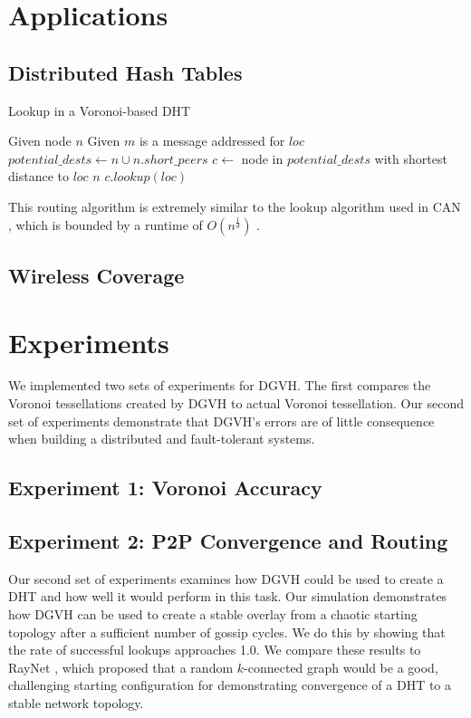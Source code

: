 \documentclass[11pt, conference, letterpaper]{IEEEtran}
\begin{document}
\section{Applications}
\label{sec:applications}

\subsection{Distributed Hash Tables}


\begin{algorithm}
	\caption{Lookup in a Voronoi-based DHT}
	\label{lookup}
	\begin{algorithmic}[1] 
		\STATE Given node $n$
		\STATE Given $m$ is a message addressed for $loc$
		\STATE $potential\_dests \leftarrow n \cup n.short\_peers$
		\STATE $c \leftarrow $ node in $ potential\_dests$ with shortest distance to $loc$
		\RETURN $n$
		\ELSE
		\RETURN $c.lookup(loc)$
		\ENDIF
	\end{algorithmic}
\end{algorithm}

This routing algorithm is extremely similar to the lookup algorithm used in CAN \cite{can}, which is bounded by a runtime of $O(n^{\frac{1}{d}})$ .




\subsection{Wireless Coverage}


\section{Experiments}
\label{sec:experiments}


We implemented two sets of experiments for DGVH.
The first compares the Voronoi tessellations created by DGVH to actual Voronoi tessellation.
Our second set of experiments demonstrate that DGVH's errors are of little consequence when building a distributed and fault-tolerant systems.


\subsection{Experiment 1:  Voronoi Accuracy}

\subsection{Experiment 2: P2P Convergence and Routing}
Our second set of experiments examines how DGVH could be used to create a DHT and how well it would perform in this task.
Our simulation demonstrates how DGVH  can be used to create a stable overlay from a chaotic starting topology after a sufficient number of gossip cycles.  
We do this by showing that the rate of successful lookups approaches 1.0.
We compare these results to RayNet \cite{raynet}, which proposed that a random $k$-connected graph would be a good, challenging starting configuration for demonstrating convergence of a DHT to a stable network topology.
\end{document}
